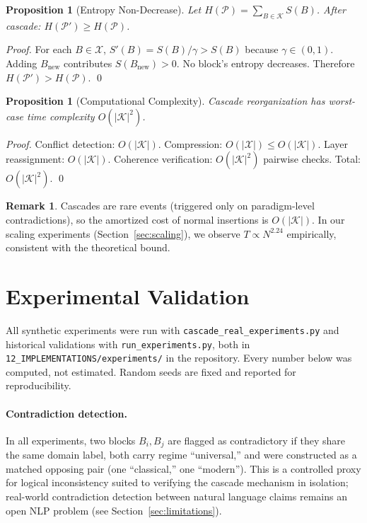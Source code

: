 \documentclass[11pt,a4paper]{article}
\newtheorem{proposition}[theorem]{Proposition}
\theoremstyle{definition}
\newtheorem{remark}[theorem]{Remark}
\begin{document}
\begin{proposition}[Entropy Non-Decrease]\label{prop:entropy}
Let $H(\mathcal{P}) = \sum_{B \in \mathcal{K}} S(B)$. After cascade:
$H(\mathcal{P}') \geq H(\mathcal{P})$.
\end{proposition}
\begin{proof}
For each $B \in \mathcal{X}$, $S'(B) = S(B)/\gamma > S(B)$ because $\gamma \in (0,1)$.
Adding $B_{\text{new}}$ contributes $S(B_{\text{new}}) > 0$. No block's entropy
decreases. Therefore $H(\mathcal{P}') > H(\mathcal{P})$. \qed
\end{proof}

\begin{proposition}[Computational Complexity]\label{prop:complexity}
Cascade reorganization has worst-case time complexity $O(|\mathcal{K}|^2)$.
\end{proposition}
\begin{proof}
Conflict detection: $O(|\mathcal{K}|)$. Compression: $O(|\mathcal{X}|) \leq
O(|\mathcal{K}|)$. Layer reassignment: $O(|\mathcal{K}|)$. Coherence verification:
$O(|\mathcal{K}|^2)$ pairwise checks. Total: $O(|\mathcal{K}|^2)$. \qed
\end{proof}

\begin{remark}
Cascades are rare events (triggered only on paradigm-level contradictions), so the
amortized cost of normal insertions is $O(|\mathcal{K}|)$. In our scaling experiments
(Section~\ref{sec:scaling}), we observe $T \propto N^{2.24}$ empirically, consistent
with the theoretical bound.
\end{remark}

\section{Experimental Validation}\label{sec:experiments}

All synthetic experiments were run with
\texttt{cascade\_real\_experiments.py} and historical validations with
\texttt{run\_experiments.py}, both in \texttt{12\_IMPLEMENTATIONS/experiments/}
in the repository. Every number below was computed, not estimated. Random seeds
are fixed and reported for reproducibility.

\paragraph{Contradiction detection.} In all experiments, two blocks $B_i, B_j$ are
flagged as contradictory if they share the same domain label, both carry regime
``universal,'' and were constructed as a matched opposing pair (one ``classical,'' one
``modern''). This is a controlled proxy for logical inconsistency suited to verifying
the cascade mechanism in isolation; real-world contradiction detection between natural
language claims remains an open NLP problem (see Section~\ref{sec:limitations}).
\end{document}
